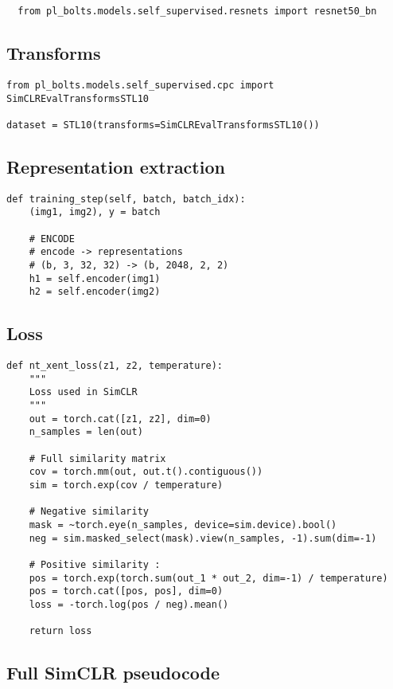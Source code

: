 \documentclass{article}
\begin{document}
\begin{lstlisting}
  from pl_bolts.models.self_supervised.resnets import resnet50_bn
\end{lstlisting}

\subsection{Transforms}

\begin{lstlisting}
from pl_bolts.models.self_supervised.cpc import SimCLREvalTransformsSTL10

dataset = STL10(transforms=SimCLREvalTransformsSTL10())
\end{lstlisting}

\subsection{Representation extraction}
\begin{lstlisting}
def training_step(self, batch, batch_idx):
    (img1, img2), y = batch

    # ENCODE
    # encode -> representations
    # (b, 3, 32, 32) -> (b, 2048, 2, 2)
    h1 = self.encoder(img1)
    h2 = self.encoder(img2)
\end{lstlisting}

\subsection{Loss}

\begin{lstlisting}
def nt_xent_loss(z1, z2, temperature):
    """
    Loss used in SimCLR
    """
    out = torch.cat([z1, z2], dim=0)
    n_samples = len(out)

    # Full similarity matrix
    cov = torch.mm(out, out.t().contiguous())
    sim = torch.exp(cov / temperature)

    # Negative similarity
    mask = ~torch.eye(n_samples, device=sim.device).bool()
    neg = sim.masked_select(mask).view(n_samples, -1).sum(dim=-1)

    # Positive similarity :
    pos = torch.exp(torch.sum(out_1 * out_2, dim=-1) / temperature)
    pos = torch.cat([pos, pos], dim=0)
    loss = -torch.log(pos / neg).mean()

    return loss

\end{lstlisting}

\subsection{Full SimCLR pseudocode}
\end{document}
